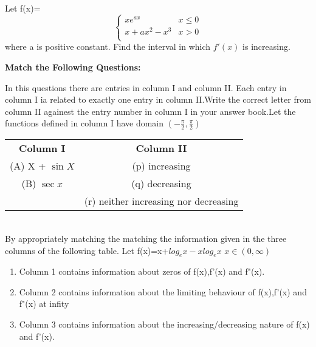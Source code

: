\item Let 
f(x)=
\[ \begin{cases} 
      xe^{ax} &  x \leq 0 \\
      x + ax^2 - x^3& x > 0\\
      \end{cases}
\] 
where a is positive constant. Find  the interval in which $f'(x)$ is increasing.



\clearpage
\onecolumn

\textbf{Match the Following Questions:}

\item In this questions there are entries in column I and column II. Each entry in column I ia related to exactly one entry in column II.Write the correct letter from column II againest the entry number in column I  in your answer book.Let the functions defined in column I have domain $(-\frac{\pi}{2},\frac{\pi}{2})$
\begin{table}[ht!]
\centering
\begin{tabular}{c c} 
 \textbf{Column I} & \textbf{Column II}\\ [0.5ex] 
 (A) X + $\sin X$                                            &(p) increasing\\
 (B) $\sec x$                                                &(q) decreasing\\
                                                            &(r) neither increasing nor decreasing\\
\end{tabular}
\end{table}\\
By appropriately matching the matching the information given in the three columns of the following table.
Let f(x)=x+$log_ex-xlog_ex$ $x \in (0,\infty)$
\begin{enumerate}
    \item Column 1 contains information about zeros of f(x),f'(x) and f"(x).
    \item Column 2 contains information about the limiting behaviour of f(x),f'(x) and f"(x) at infity
    \item Column 3 contains information about the increasing/decreasing nature of f(x) and f'(x).
\end{enumerate}


